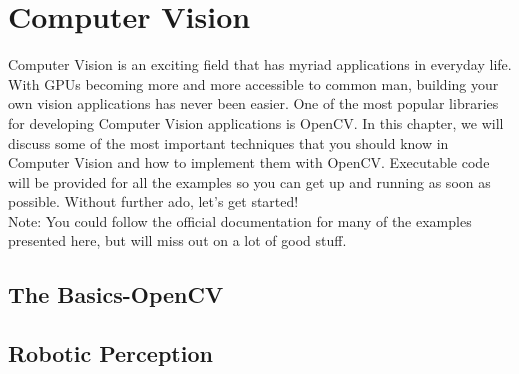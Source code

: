 \chapter{Computer Vision}
Computer Vision is an exciting field that has myriad applications in everyday life. With GPUs becoming more and more accessible to common man, building your own vision applications has never been easier. One of the most popular libraries for developing Computer Vision applications is OpenCV. In this chapter, we will discuss some of the most important techniques that you should know in Computer Vision and how to implement them with OpenCV. Executable code will be provided for all the examples so you can get up and running as soon as possible. Without further ado, let's get started!\\
Note: You could follow the official documentation for many of the examples presented here, but will miss out on a lot of good stuff.
\section{The Basics-OpenCV}

\section{Robotic Perception}

%
%
%
